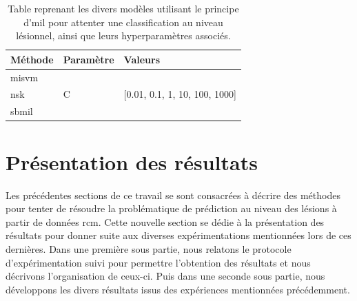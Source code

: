 \begin{table}[H]
    \centering
    \begin{tabular}{lll}
    \toprule
    \textbf{Méthode}    & \textbf{Paramètre}& \textbf{Valeurs}                                  \\ \midrule
    \gls{misvm}         & \multirow{3}{*}{C}& \multirow{3}{*}{[0.01, 0.1, 1, 10, 100, 1000]}    \\ \cline{1-1}
    \gls{nsk}           &                   &                                                   \\ \cline{1-1} 
    \gls{sbmil}         &                   &                                                   \\ \bottomrule 
    \end{tabular}    
    \caption{Table reprenant les divers modèles utilisant le principe d'\gls{mil} pour attenter une classification au niveau lésionnel, ainsi que leurs hyperparamètres associés.}
    \label{tab:patient_decision_weak_hyperparameters}
\end{table}\par
\clearpage

\section{Présentation des résultats}
Les précédentes sections de ce travail se sont consacrées à décrire des méthodes pour tenter de résoudre la problématique de prédiction au niveau des lésions à partir de données \gls{rcm}. Cette nouvelle section se dédie à la présentation des résultats pour donner suite aux diverses expérimentations mentionnées lors de ces dernières. Dans une première sous partie, nous relatons le protocole d'expérimentation suivi pour permettre l'obtention des résultats et nous décrivons l'organisation de ceux-ci. Puis dans une seconde sous partie, nous développons les divers résultats issus des expériences mentionnées précédemment.\par

